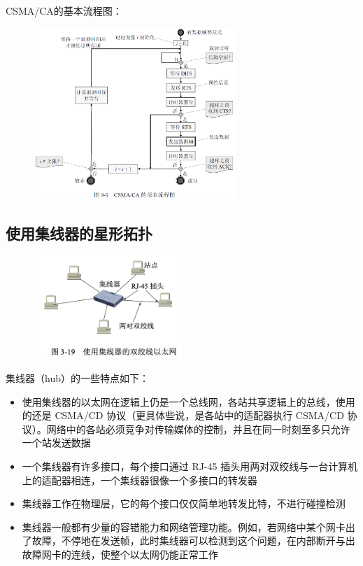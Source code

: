 \documentclass[cs4size,a4paper,10pt]{ctexart}
\begin{document}
	CSMA/CA的基本流程图：
	\begin{figure}[H]
		\centering
		\includegraphics[width=0.68\textwidth]{img/3.4.3.6}
	\end{figure}

	\subsection{使用集线器的星形拓扑}

	\begin{figure}[H]
		\centering
		\includegraphics[width=0.5\textwidth]{img/3.19}
	\end{figure}

	集线器（hub）的一些特点如下：
	\begin{itemize}
		\item 使用集线器的以太网在逻辑上仍是一个总线网，各站共享逻辑上的总线，使用的还是 CSMA/CD 协议（更具体些说，是各站中的适配器执行 CSMA/CD 协议）。网络中的各站必须竞争对传输媒体的控制，并且在同一时刻至多只允许一个站发送数据
		\item 一个集线器有许多接口，每个接口通过 RJ-45 插头用两对双绞线与一台计算机上的适配器相连，一个集线器很像一个多接口的转发器
		\item 集线器工作在物理层，它的每个接口仅仅简单地转发比特，不进行碰撞检测
		\item 集线器一般都有少量的容错能力和网络管理功能。例如，若网络中某个网卡出了故障，不停地在发送帧，此时集线器可以检测到这个问题，在内部断开与出故障网卡的连线，使整个以太网仍能正常工作
	\end{itemize}
\end{document}
